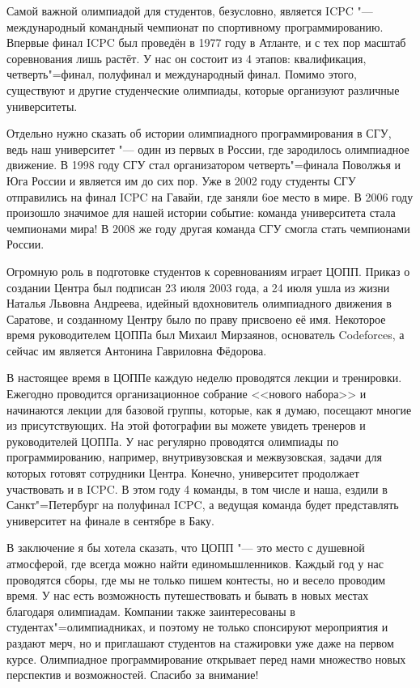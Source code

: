 \documentclass[10pt]{article}
\begin{document}
Самой важной олимпиадой для студентов, безусловно, является ICPC "--- международный командный чемпионат по спортивному программированию. Впервые финал ICPC был проведён в 1977 году в Атланте, и с тех пор масштаб соревнования лишь растёт. У нас он состоит из 4 этапов: квалификация, четверть"=финал, полуфинал и международный финал. Помимо этого, существуют и другие студенческие олимпиады, которые организуют различные университеты.

Отдельно нужно сказать об истории олимпиадного программирования в СГУ, ведь наш университет "--- один из первых в России, где зародилось олимпиадное движение. В 1998 году СГУ стал организатором четверть"=финала Поволжья и Юга России и является им до сих пор. Уже в 2002 году студенты СГУ отправились на финал ICPC на Гавайи, где заняли 6ое место в мире. В 2006 году произошло значимое для нашей истории событие: команда университета стала чемпионами мира! В 2008 же году другая команда СГУ смогла стать чемпионами России.

Огромную роль в подготовке студентов к соревнованиям играет ЦОПП. Приказ о создании Центра был подписан 23 июля 2003 года, а 24 июля ушла из жизни Наталья Львовна Андреева, идейный вдохновитель олимпиадного движения в Саратове, и созданному Центру было по праву присвоено её имя. Некоторое время руководителем ЦОППа был Михаил Мирзаянов, основатель Codeforces, а сейчас им является Антонина Гавриловна Фёдорова.

В настоящее время в ЦОППе каждую неделю проводятся лекции и тренировки. Ежегодно проводится организационное собрание <<нового набора>> и начинаются лекции для базовой группы, которые, как я думаю, посещают многие из присутствующих. На этой фотографии вы можете увидеть тренеров и руководителей ЦОППа. У нас регулярно проводятся олимпиады по программированию, например, внутривузовская и межвузовская, задачи для которых готовят сотрудники Центра. Конечно, университет продолжает участвовать и в ICPC. В этом году 4 команды, в том числе и наша, ездили в Санкт"=Петербург на полуфинал ICPC, а ведущая команда будет представлять университет на финале в сентябре в Баку.

В заключение я бы хотела сказать, что ЦОПП "--- это место с душевной атмосферой, где всегда можно найти единомышленников. Каждый год у нас проводятся сборы, где мы не только пишем контесты, но и весело проводим время. У нас есть возможность путешествовать и бывать в новых местах благодаря олимпиадам. Компании также заинтересованы в студентах"=олимпиадниках, и поэтому не только спонсируют мероприятия и раздают мерч, но и приглашают студентов на стажировки уже даже на первом курсе. Олимпиадное программирование открывает перед нами множество новых перспектив и возможностей. Спасибо за внимание!
\end{document}
